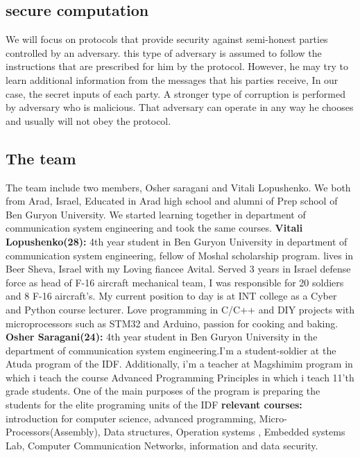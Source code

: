 \documentclass[12pt]{article}
\begin{document}
\subsection{secure computation}
We will focus on protocols that provide security against semi-honest parties controlled by an adversary. this type of adversary is assumed to follow the instructions that are prescribed for him by the protocol. However, he may try to learn additional information from the messages that his parties receive, In our case, the secret inputs of each party. A stronger type of corruption is performed by adversary who is malicious. That adversary can operate in any way he chooses and usually will not obey the protocol.


\subsection{The team}
The team include two members, Osher saragani and Vitali Lopushenko. We both from Arad, Israel, Educated in Arad high school and alumni of Prep school of Ben Guryon University. We started learning together in department of communication system engineering and took the same courses.
\hfill\break\hfill\break
\textbf{Vitali Lopushenko(28):}
4th year student in Ben Guryon University in department of communication system engineering, fellow of Moshal scholarship program. lives in Beer Sheva, Israel with my Loving fiancee Avital. Served 3 years in Israel defense force as head of F-16 aircraft mechanical team, I was responsible 
for 20 soldiers and 8 F-16 aircraft's. My current position to day is at INT college as a Cyber and Python course lecturer.
Love programming in C/C++ and DIY projects with microprocessors such as STM32 and Arduino, passion for cooking and baking.
\hfill\break \hfill\break 
\textbf{Osher Saragani(24):}
4th year student in Ben Guryon University in the department of communication system engineering.I’m a student-soldier at the Atuda program of the IDF. Additionally, i’m a teacher at Magshimim program in which  i teach the course Advanced Programming Principles in which i teach 11’th grade students. One of the main purposes of the program is preparing the  students for the elite programing units of the IDF
\hfill\break\hfill\break
\textbf{relevant courses:} introduction for computer science, advanced programming, Micro-Processors(Assembly), Data structures, Operation systems , Embedded systems Lab, Computer Communication Networks, information and data security. 
\end{document}
